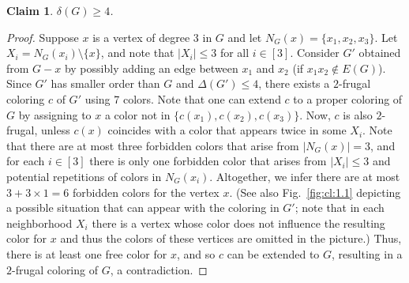 \documentclass[11pt]{article}
\newtheorem{claim}{Claim}
\begin{document}
\begin{claim} $\delta(G)\ge 4$.
\label{cl:1.1}
\end{claim} 
\begin{proof}
Suppose $x$ is a vertex of degree $3$ in $G$ and let $N_G(x)=\{x_1,x_2,x_3\}$. Let $X_i=N_G(x_i)\setminus\{x\}$, and note that $|X_i|\le 3$ for all $i\in [3]$. Consider $G'$ obtained from $G-x$ by possibly adding an edge between $x_1$ and $x_2$ (if $x_1x_2\notin E(G)$). Since $G'$ has smaller order than $G$ and $\Delta(G')\le 4$, there exists a $2$-frugal coloring $c$ of $G'$ using 7 colors. Note that one can extend $c$ to a proper coloring of $G$ by assigning to $x$ a color not in $\{c(x_1),c(x_2),c(x_3)\}$. Now, $c$ is also $2$-frugal, unless $c(x)$ coincides with a color that appears twice in some $X_i$. Note that there are at most three forbidden colors that arise from $|N_G(x)|=3$, and for each $i\in [3]$ there is only one forbidden color that arises from $|X_i|\le 3$ and potential repetitions of colors in $N_G(x_i)$. Altogether, we infer there are at most $3+3\times 1=6$ forbidden colors for the vertex $x$. (See also Fig.~\ref{fig:cl:1.1} depicting a possible situation that can appear with the coloring in $G'$; note that in each neighborhood $X_i$ there is a vertex whose color does not influence the resulting color for $x$ and thus the colors of these vertices are omitted in the picture.) Thus, there is at least one free color for $x$, and so $c$ can be extended to $G$, resulting in a $2$-frugal coloring of $G$, a contradiction.
\end{proof}
\end{document}
